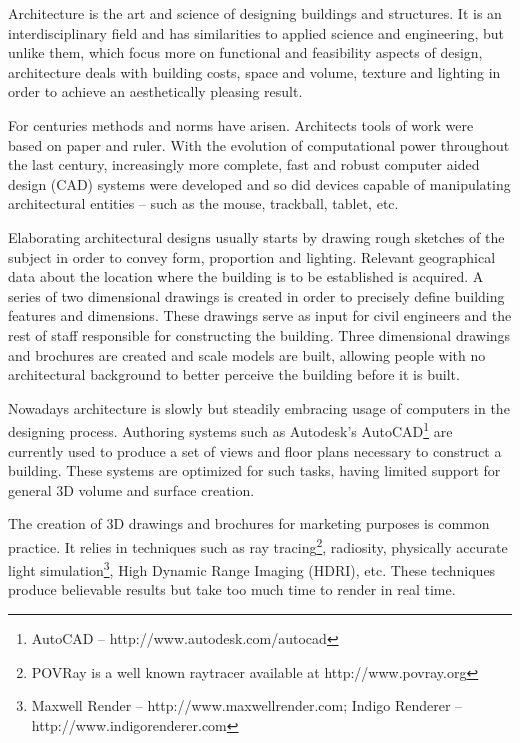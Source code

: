 
Architecture is the art and science of designing buildings and structures.
It is an interdisciplinary field and has similarities to applied science and
engineering, but unlike them, which focus more on functional and feasibility aspects of design, 
architecture deals with building costs, space and volume, texture and lighting
in order to achieve an aesthetically pleasing result.

For centuries methods and norms have arisen. Architects tools of work were based on paper and ruler.
With the evolution of computational power throughout the last century, 
increasingly more complete, fast and robust computer aided design (CAD) systems were developed and so did
devices capable of manipulating architectural entities -- such as the mouse, trackball, tablet, etc.

Elaborating architectural designs usually starts by drawing rough sketches of the subject
in order to convey form, proportion and lighting. Relevant geographical data about the location
where the building is to be established is acquired. A series of two dimensional drawings is created
in order to precisely define building features and dimensions.
These drawings serve as input for civil engineers and the rest of staff responsible for constructing the building.
Three dimensional drawings and brochures are created and scale models are built, allowing
people with no architectural background to better perceive the building before it is built.

Nowadays architecture is slowly but steadily embracing usage of computers in the designing process.
Authoring systems such as Autodesk's AutoCAD\footnote{AutoCAD -- http://www.autodesk.com/autocad}
are currently used to produce a set of views and floor plans necessary to construct a building.
These systems are optimized for such tasks, having limited support for general 3D volume and surface creation.

The creation of 3D drawings and brochures for marketing purposes is common practice.
It relies in techniques such as
ray tracing\footnote{POVRay is a well known raytracer available at http://www.povray.org},
radiosity,
physically accurate light simulation\footnote{Maxwell Render -- http://www.maxwellrender.com; Indigo Renderer -- http://www.indigorenderer.com},
High Dynamic Range Imaging (HDRI), etc.
These techniques produce believable results but take too much time to render in real time.

